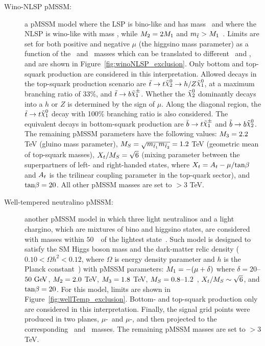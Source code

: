 \begin{description}
				\item[\boldmath Wino-NLSP pMSSM:] a \ac{pMSSM} model where the \ac{LSP} is bino-like and has mass \mone\ and where the \ac{NLSP} is wino-like with mass \mtwo, while $M_{2}=2M_{1}$ and $m_{\tilde{t}}>M_{1}$~\cite{Papucci2011}. Limits are set for both positive and negative $\mu$ (the higgsino mass parameter) as a function of the \stop\ and \ninoone\ masses which can be translated to different \mone\ and \mqlthree, and are shown in Figure~\ref{fig:winoNLSP_exclusion}. Only bottom and top-squark production are considered in this interpretation. Allowed decays in the top-squark production scenario are $\stop\to t \ninotwo\to h/Z \LSP$, at a maximum branching ratio of 33\%, and $\stop \to b \chinoonepm$. Whether the $\ninotwo$ dominantly decays into a $h$ or $Z$ is determined by the sign of $\mu$. Along the diagonal region, the $\stop\to t\LSP$ decay with 100\% branching ratio is also considered. The equivalent decays in bottom-squark production are $\sbottom\to t\chinoonepm$ and $\sbottom\to b\ninotwo$. The remaining \ac{pMSSM} parameters have the following values: $M_{3}=2.2$ TeV (gluino mass parameter), $M_{S}=\sqrt{m_{\tilde{t}_1} m_{\tilde{t}_2}}=1.2$ TeV (geometric mean of top-squark masses), $X_{t}/M_{S}=\sqrt{6}$ (mixing parameter between the superpartners of left- and right-handed states, where $X_{t}=A_{t}-\mu/\mathrm{tan}\beta$ and $A_{t}$ is the trilinear coupling parameter in the top-quark sector), and $\mathrm{tan}\beta=20$. All other \ac{pMSSM} masses are set to $>$3 TeV. 

				\item[\boldmath Well-tempered neutralino pMSSM:] another \ac{pMSSM} model in which three light neutralinos and a light chargino, which are mixtures of bino and higgsino states, are considered with masses within $50$~\GeV\ of the lightest state~\cite{atlasDM,wellTemp}. Such model is designed to satisfy the \ac{SM} Higgs boson mass and the dark-matter relic density ($0.10<\Omega h^{2}<0.12$, where $\Omega$ is energy density parameter and $h$ is the Planck constant~\cite{relic_density}) with \ac{pMSSM} parameters: $M_{1}=-(\mu+\delta)$ where $\delta=20$--$50\gev$, $M_{2}=2.0$ TeV, $M_{3}=1.8$ TeV, $M_{S}=0.8$--$1.2$~\TeV, $X_{t}/M_{S}\sim\sqrt{6}$, and $\mathrm{tan}\beta=20$. For this model, limits are shown in Figure~\ref{fig:wellTemp_exclusion}. Bottom- and top-squark production only are considered in this interpretation. Finally, the signal grid points were produced in two planes, $\mu$-\mtr\ and $\mu$-\mqlthree, and then projected to the corresponding \stop\ and \ninoone\ masses. The remaining \ac{pMSSM} masses are set to $>3$ TeV.
			\end{description}

